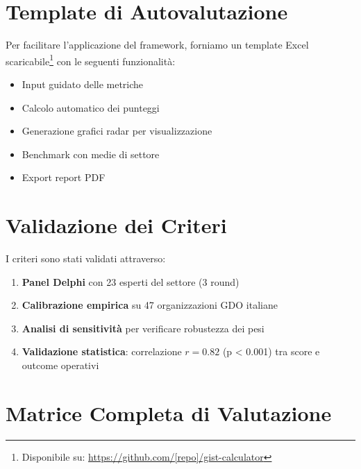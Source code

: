 \section{Template di Autovalutazione}

Per facilitare l'applicazione del framework, forniamo un template Excel scaricabile\footnote{Disponibile su: \url{https://github.com/[repo]/gist-calculator}} con le seguenti funzionalità:

\begin{itemize}
    \item Input guidato delle metriche
    \item Calcolo automatico dei punteggi
    \item Generazione grafici radar per visualizzazione
    \item Benchmark con medie di settore
    \item Export report PDF
\end{itemize}

\section{Validazione dei Criteri}

I criteri sono stati validati attraverso:

\begin{enumerate}
    \item \textbf{Panel Delphi} con 23 esperti del settore (3 round)
    \item \textbf{Calibrazione empirica} su 47 organizzazioni GDO italiane
    \item \textbf{Analisi di sensitività} per verificare robustezza dei pesi
    \item \textbf{Validazione statistica}: correlazione $r = 0.82$ (p < 0.001) tra score e outcome operativi
\end{enumerate}


\section{Matrice Completa di Valutazione}

